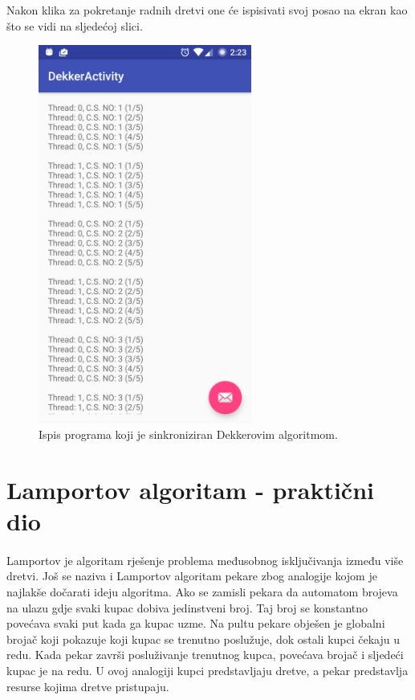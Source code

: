 \documentclass[times, utf8, zavrsni]{fer}
\begin{document}
Nakon klika za pokretanje radnih dretvi one će ispisivati svoj posao na ekran kao što  se vidi na sljedećoj slici.

\begin{figure}[ht!]
\centering
\includegraphics[width=70mm]{img/DekkerActivity.png}
\caption{Ispis programa koji je sinkroniziran Dekkerovim algoritmom.}
\label{overflow}
\end{figure}

\section{Lamportov algoritam - praktični dio}
\paragraph{}
Lamportov je algoritam rješenje problema međusobnog isključivanja između više dretvi. Još se naziva i Lamportov algoritam pekare zbog analogije kojom je najlakše dočarati ideju algoritma. Ako se zamisli pekara da automatom brojeva na ulazu gdje svaki kupac dobiva jedinstveni broj. Taj broj se konstantno povećava svaki put kada ga kupac uzme. Na pultu pekare obješen je globalni brojač koji pokazuje koji kupac se trenutno poslužuje, dok ostali kupci čekaju u redu. Kada pekar završi posluživanje  trenutnog kupca, povećava brojač i sljedeći kupac je na redu. U ovoj analogiji kupci predstavljaju dretve, a pekar predstavlja resurse kojima dretve pristupaju.\\
\end{document}
